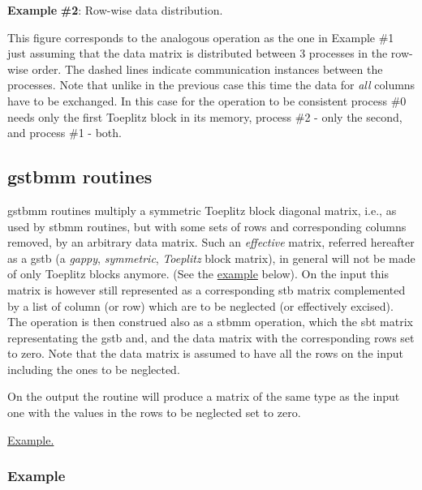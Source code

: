 {\bfseries Example} {\bfseries \#2}\-: Row-\/wise data distribution.



This figure corresponds to the analogous operation as the one in Example \#1 just assuming that the data matrix is distributed between 3 processes in the row-\/wise order. The dashed lines indicate communication instances between the processes. Note that unlike in the previous case this time the data for {\itshape all} columns have to be exchanged. In this case for the operation to be consistent process \#0 needs only the first Toeplitz block in its memory, process \#2 -\/ only the second, and process \#1 -\/ both. \hypertarget{toeplitz_funct_gstbmm}{}\subsection{gstbmm routines}\label{toeplitz_funct_gstbmm}
{\ttfamily gstbmm} routines multiply a symmetric Toeplitz block diagonal matrix, i.\-e., as used by {\ttfamily stbmm} routines, but with some sets of rows and corresponding columns removed, by an arbitrary data matrix. Such an {\itshape effective} matrix, referred hereafter as a {\ttfamily gstb} (a {\itshape gappy}, {\itshape symmetric}, {\itshape Toeplitz} block matrix), in general will not be made of only Toeplitz blocks anymore. (See the \hyperlink{toeplitz_funct_gstbmm_example}{example} below). On the input this matrix is however still represented as a corresponding {\ttfamily stb} matrix complemented by a list of column (or row) which are to be neglected (or effectively excised). The operation is then construed also as a {\ttfamily stbmm} operation, which the {\ttfamily sbt} matrix representating the {\ttfamily gstb} and, and the data matrix with the corresponding rows set to zero. Note that the data matrix is assumed to have all the rows on the input including the ones to be neglected.

On the output the routine will produce a matrix of the same type as the input one with the values in the rows to be neglected set to zero.

\hyperlink{toeplitz_funct_gstbmm_example}{Example.} \hypertarget{toeplitz_funct_gstbmm_example}{}\subsubsection{Example}\label{toeplitz_funct_gstbmm_example}


